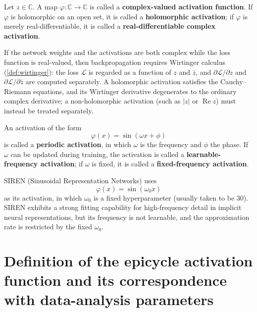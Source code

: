\begin{definition}\label{def:complex-activation}
Let $z\in\mathbb C$. A map $\varphi:\mathbb C\to\mathbb C$ is called a \textbf{complex-valued activation function}. If $\varphi$ is holomorphic on an open set, it is called a \textbf{holomorphic activation}; if $\varphi$ is merely real-differentiable, it is called a \textbf{real-differentiable complex activation}.
\end{definition}

\begin{remark}\label{rem:complex-activation-calculus}
If the network weights and the activations are both complex while the loss function is real-valued, then backpropagation requires Wirtinger calculus (\cref{def:wirtinger}): the loss $\mathcal L$ is regarded as a function of $z$ and $\bar z$, and $\partial\mathcal L/\partial z$ and $\partial\mathcal L/\partial\bar z$ are computed separately. A holomorphic activation satisfies the Cauchy--Riemann equations, and its Wirtinger derivative degenerates to the ordinary complex derivative; a non-holomorphic activation (such as $|z|$ or $\operatorname{Re}z$) must instead be treated separately.
\end{remark}

\begin{definition}\label{def:periodic-activation}
An activation of the form
\[
\varphi(x)=\sin(\omega x+\phi)
\]
is called a \textbf{periodic activation}, in which $\omega$ is the frequency and $\phi$ the phase. If $\omega$ can be updated during training, the activation is called a \textbf{learnable-frequency activation}; if $\omega$ is fixed, it is called a \textbf{fixed-frequency activation}.
\end{definition}

\begin{example}\label{ex:siren}
SIREN (Sinusoidal Representation Networks) uses
\[
\varphi(x)=\sin(\omega_0 x)
\]
as its activation, in which $\omega_0$ is a fixed hyperparameter (usually taken to be $30$). SIREN exhibits a strong fitting capability for high-frequency detail in implicit neural representations, but its frequency is not learnable, and the approximation rate is restricted by the fixed $\omega_0$.
\end{example}

\section{Definition of the epicycle activation function and its correspondence with data-analysis parameters}

